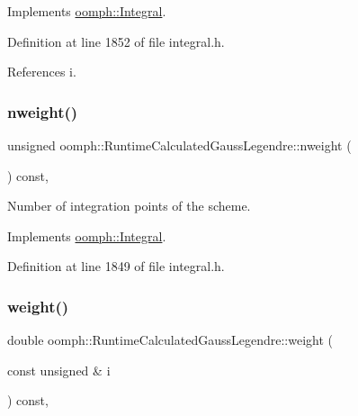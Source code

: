 Implements \hyperlink{classoomph_1_1Integral_a1a2122f99a87c18649bafdd9ed739758}{oomph\+::\+Integral}.



Definition at line 1852 of file integral.\+h.



References i.

\mbox{\label{classoomph_1_1RuntimeCalculatedGaussLegendre_ae2f0ed3fd3e9e984988438156695f247}} 
\subsubsection{\texorpdfstring{nweight()}{nweight()}}
{\footnotesize\ttfamily unsigned oomph\+::\+Runtime\+Calculated\+Gauss\+Legendre\+::nweight (\begin{DoxyParamCaption}{ }\end{DoxyParamCaption}) const\hspace{0.3cm}{\ttfamily [inline]}, {\ttfamily [virtual]}}



Number of integration points of the scheme. 



Implements \hyperlink{classoomph_1_1Integral_a1a270de9d99a1fcf1d25a6c1017f65fa}{oomph\+::\+Integral}.



Definition at line 1849 of file integral.\+h.

\mbox{\label{classoomph_1_1RuntimeCalculatedGaussLegendre_a9201c82ccd43b9f8dc0b95e55222595d}} 
\subsubsection{\texorpdfstring{weight()}{weight()}}
{\footnotesize\ttfamily double oomph\+::\+Runtime\+Calculated\+Gauss\+Legendre\+::weight (\begin{DoxyParamCaption}\item[{const unsigned \&}]{i }\end{DoxyParamCaption}) const\hspace{0.3cm}{\ttfamily [inline]}, {\ttfamily [virtual]}}




